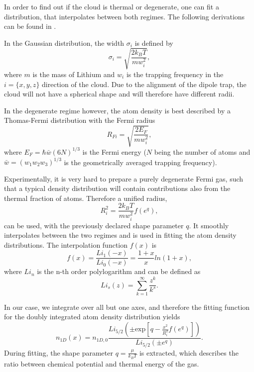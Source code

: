 In order to find out if the cloud is thermal or degenerate, one can fit a distribution, that interpolates between both regimes. The following derivations can be found in \cite{Ketterle2008}.

In the Gaussian distribution, the width $\sigma_i$ is defined by
\begin{equation}
\sigma _i = \sqrt{\frac{2k_BT}{mw_i^2}},
\end{equation}
where $m$ is the mass of Lithium and $w_i$ is the trapping frequency in the $i=\{x,y,z\}$ direction of the cloud. Due to the alignment of the dipole trap, the cloud will not have a spherical shape and will therefore have different radii\cite{Heck2012}.

In the degenerate regime however, the atom density is best described by a Thomas-Fermi distribution with the Fermi radius
\begin{equation}
R_{Fi} = \sqrt{\frac{2E_F}{mw_i^2}},
\end{equation}
where $E_F=\hbar \bar{w} (6N)^{1/3}$ is the Fermi energy ($N$ being the number of atoms and $\bar{w}=(w_1 w_2 w_3)^{1/3}$ is the geometrically averaged trapping frequency).

Experimentally, it is very hard to prepare a purely degenerate Fermi gas, such that a typical density distribution will contain contributions also from the thermal fraction of atoms.
Therefore a unified radius,
\begin{equation}
R_i^2 = \frac{2k_BT}{mw_i^2}f( e^{q}),
\end{equation}
can be used, with the previously declared shape parameter $q$. It smoothly interpolates between the two regimes and is used in fitting the atom density distributions.
The interpolation function $f(x)$ is
\begin{equation}
f(x) = \frac{Li_1(-x)}{Li_0(-x)} = \frac{1+x}{x} ln(1+x),
\end{equation}
where $Li_n$ is the n-th order polylogarithm and can be defined as
\begin{equation}
Li_s(z) = \sum_{k=1}^{\infty} \frac{z^k}{k^s}.
\end{equation}

In our case, we integrate over all but one axes, and therefore the fitting function for the doubly integrated atom density distribution yields
\begin{equation}
\label{eq:n1d}
n_{1D}(x) = n_{1D,0}\frac{Li_{5/2}\left( \pm \mathrm{exp}\left[ q-\frac{x^2}{R_i^2}f(e^q)\right] \right)}{Li_{5/2}(\pm e^q)}.
\end{equation}
During fitting, the shape parameter $q=\frac{\mu}{k_B T}$ is extracted, which describes the ratio between chemical potential and thermal energy of the gas.

